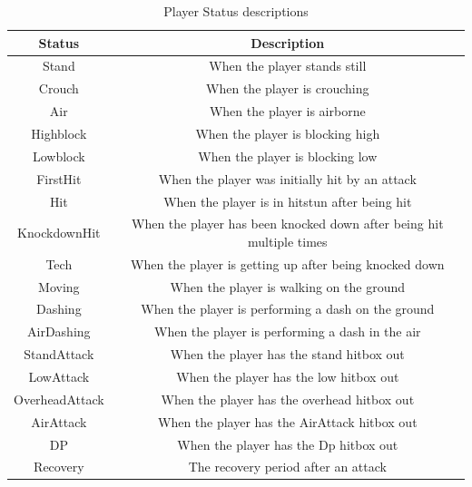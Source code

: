 \begin{table}[h]
	\centering
	\caption{Player Status descriptions}
	\begin{tabular}{| c | c |}
		\hline
		Status & Description \\
		\hline
		Stand & When the player stands still \\
		\hline
		Crouch & When the player is crouching \\
		\hline
		Air & When the player is airborne \\
		\hline
		Highblock & When the player is blocking high \\
		\hline
		Lowblock &  When the player is blocking low \\
		\hline
		FirstHit & When the player was initially hit by an attack \\
		\hline
		Hit & When the player is in hitstun after being hit \\
		\hline
		KnockdownHit & When the player has been knocked down after being hit multiple times \\
		\hline
		Tech & When the player is getting up after being knocked down \\
		\hline
		Moving & When the player is walking on the ground \\
		\hline
		Dashing & When the player is performing a dash on the ground \\
		\hline
		AirDashing & When the player is performing a dash in the air \\
		\hline
		StandAttack & When the player has the stand hitbox out\\
		\hline 
		LowAttack & When the player has the low hitbox out\\
		\hline 
		OverheadAttack & When the player has the overhead hitbox out\\
		\hline 
		AirAttack & When the player has the AirAttack hitbox out\\
		\hline
		DP& When the player has the Dp hitbox out\\
		\hline 
		Recovery & The recovery period after an attack\\
		\hline
	\end{tabular}
	\label{playerstatus}
\end{table}

